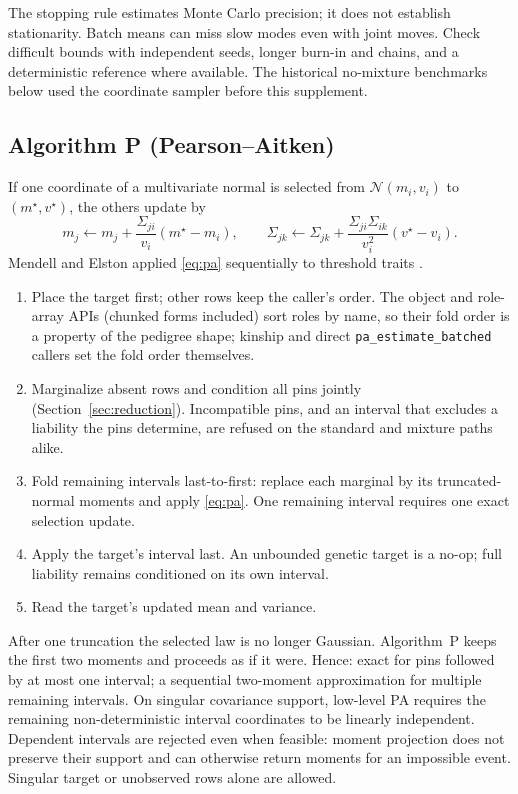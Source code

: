 \documentclass[11pt,a4paper]{article}
\begin{document}
The stopping rule estimates Monte Carlo precision; it does not establish
stationarity. Batch means can miss slow modes even with joint moves.
Check difficult bounds with independent seeds, longer burn-in and chains,
and a deterministic reference where available. The historical no-mixture
benchmarks below used the coordinate sampler before this supplement.

\subsection{Algorithm P (Pearson--Aitken)}
\label{sec:pa}

If one coordinate of a multivariate normal is selected from
$\mathcal{N}(m_i,v_i)$ to $(m^\star,v^\star)$, the others update by
\cite{pearson1903,aitken1935}
\begin{equation}
  m_j \leftarrow m_j+\frac{\Sigma_{ji}}{v_i}(m^\star-m_i),
  \qquad
  \Sigma_{jk} \leftarrow
  \Sigma_{jk}+\frac{\Sigma_{ji}\Sigma_{ik}}{v_i^{2}}(v^\star-v_i).
  \label{eq:pa}
\end{equation}
Mendell and Elston applied \eqref{eq:pa} sequentially to threshold
traits \cite{mendell1974}.

\begin{enumerate}
\setlength{\itemsep}{3pt}\setlength{\parsep}{0pt}
\item[P1.] Place the target first; other rows keep the caller's order.
  The object and role-array APIs (chunked forms included) sort roles by name, so
  their fold order is a property of the pedigree shape; kinship and direct
  \texttt{pa\_estimate\_batched} callers set the fold order themselves.
\item[P2.] Marginalize absent rows and condition all pins jointly (Section~\ref{sec:reduction}).
  Incompatible pins, and an interval that excludes a liability the pins
  determine, are refused on the standard and mixture paths alike.
\item[P3.] Fold remaining intervals last-to-first: replace each marginal
  by its truncated-normal moments and apply \eqref{eq:pa}.
  One remaining interval requires one exact selection update.
\item[P4.] Apply the target's interval last. An unbounded genetic target is
  a no-op; full liability remains conditioned on its own interval.
\item[P5.] Read the target's updated mean and variance.
\end{enumerate}

After one truncation the selected law is no longer Gaussian.
Algorithm~P keeps the first two moments and proceeds as if it
were.
Hence: exact for pins followed by at most one interval; a sequential
two-moment approximation for multiple remaining intervals.
On singular covariance support, low-level PA requires the remaining
non-deterministic interval coordinates to be linearly independent.
Dependent intervals are rejected even when feasible: moment projection
does not preserve their support and can otherwise return moments for an
impossible event. Singular target or unobserved rows alone are allowed.
\end{document}
